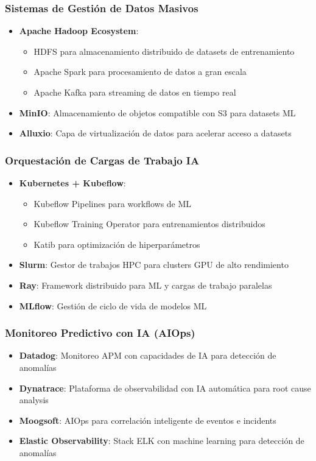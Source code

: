 \documentclass[12pt,a4paper]{article}
\begin{document}
\subsubsection{Sistemas de Gestión de Datos Masivos}
\begin{itemize}
    \item \textbf{Apache Hadoop Ecosystem}:
    \begin{itemize}
        \item HDFS para almacenamiento distribuido de datasets de entrenamiento
        \item Apache Spark para procesamiento de datos a gran escala
        \item Apache Kafka para streaming de datos en tiempo real
    \end{itemize}
    \item \textbf{MinIO}: Almacenamiento de objetos compatible con S3 para datasets ML
    \item \textbf{Alluxio}: Capa de virtualización de datos para acelerar acceso a datasets
\end{itemize}

\subsubsection{Orquestación de Cargas de Trabajo IA}
\begin{itemize}
    \item \textbf{Kubernetes + Kubeflow}:
    \begin{itemize}
        \item Kubeflow Pipelines para workflows de ML
        \item Kubeflow Training Operator para entrenamientos distribuidos
        \item Katib para optimización de hiperparámetros
    \end{itemize}
    \item \textbf{Slurm}: Gestor de trabajos HPC para clusters GPU de alto rendimiento
    \item \textbf{Ray}: Framework distribuido para ML y cargas de trabajo paralelas
    \item \textbf{MLflow}: Gestión de ciclo de vida de modelos ML
\end{itemize}

\subsubsection{Monitoreo Predictivo con IA (AIOps)}
\begin{itemize}
    \item \textbf{Datadog}: Monitoreo APM con capacidades de IA para detección de anomalías
    \item \textbf{Dynatrace}: Plataforma de observabilidad con IA automática para root cause analysis
    \item \textbf{Moogsoft}: AIOps para correlación inteligente de eventos e incidents
    \item \textbf{Elastic Observability}: Stack ELK con machine learning para detección de anomalías
\end{itemize}
\end{document}
